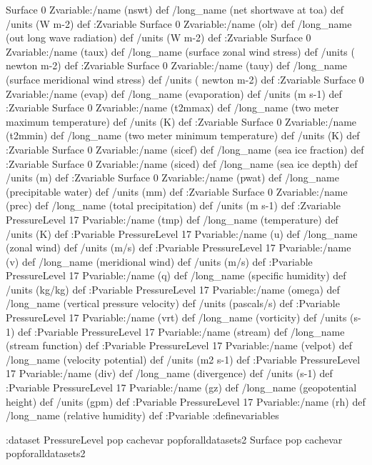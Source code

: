 \begin{ingrid}
Surface 0 Zvariable:/name (nswt) def /long_name (net shortwave at toa) def /units (W m-2) def :Zvariable
Surface 0 Zvariable:/name (olr) def /long_name (out long wave radiation) def /units (W m-2) def :Zvariable
Surface 0 Zvariable:/name (taux) def /long_name (surface zonal wind stress) def /units ( newton m-2) def :Zvariable
Surface 0 Zvariable:/name (tauy) def /long_name (surface meridional wind stress) def /units ( newton m-2) def :Zvariable
Surface 0 Zvariable:/name (evap) def /long_name (evaporation) def /units (m s-1) def :Zvariable
Surface 0 Zvariable:/name (t2mmax) def /long_name (two meter maximum temperature) def /units (K) def :Zvariable
Surface 0 Zvariable:/name (t2mmin) def /long_name (two meter minimum temperature) def /units (K) def :Zvariable
Surface 0 Zvariable:/name (sicef) def /long_name (sea ice fraction) def :Zvariable
Surface 0 Zvariable:/name (siced) def /long_name (sea ice depth) def /units (m) def :Zvariable
Surface 0 Zvariable:/name (pwat) def /long_name (precipitable water) def /units (mm) def :Zvariable
Surface 0 Zvariable:/name (prec) def /long_name (total precipitation) def /units (m s-1) def :Zvariable
PressureLevel 17 Pvariable:/name (tmp) def /long_name (temperature) def /units (K) def :Pvariable
PressureLevel 17 Pvariable:/name (u) def /long_name (zonal wind) def /units (m/s) def :Pvariable
PressureLevel 17 Pvariable:/name (v) def /long_name (meridional wind) def /units (m/s) def :Pvariable
PressureLevel 17 Pvariable:/name (q) def /long_name (specific humidity)  def /units (kg/kg) def :Pvariable
PressureLevel 17 Pvariable:/name (omega) def /long_name (vertical pressure velocity)  def /units (pascals/s) def :Pvariable
PressureLevel 17 Pvariable:/name (vrt) def /long_name (vorticity)  def /units (s-1) def :Pvariable
PressureLevel 17 Pvariable:/name (stream) def /long_name (stream function) def :Pvariable
PressureLevel 17 Pvariable:/name (velpot) def /long_name (velocity potential) def /units (m2 s-1) def :Pvariable
PressureLevel 17 Pvariable:/name (div) def /long_name (divergence) def /units (s-1) def :Pvariable
PressureLevel 17 Pvariable:/name (gz) def /long_name (geopotential height) def /units (gpm) def :Pvariable
PressureLevel 17 Pvariable:/name (rh) def /long_name (relative humidity) def :Pvariable
:definevariables

:dataset
 PressureLevel {pop} {cachevar pop}foralldatasets2
 Surface {pop} {cachevar pop}foralldatasets2
\end{ingrid}



